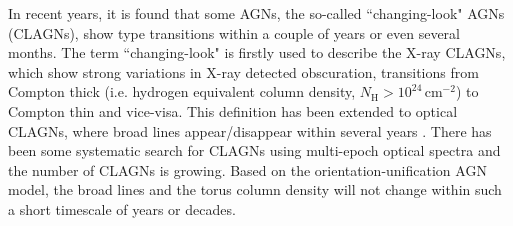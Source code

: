\documentclass[linenumbers]{aastex631}
\begin{document}
In recent years, it is found that some AGNs, the so-called ``changing-look" AGNs (CLAGNs), show type transitions within a couple of years or even several months. The term ``changing-look" is firstly used to describe the X-ray CLAGNs, which show strong variations in X-ray detected obscuration, transitions from Compton thick ({\color{red}i.e.} hydrogen equivalent column density, $N_\mathrm{H}> 10^{24}\,\mathrm{cm}^{-2}$) to Compton thin \citep[{\color{red}i.e.} $N_\mathrm{H} < 10^{22-23}\,\mathrm{cm}^{-2}$, e.g.,][]{2003MNRAS.342..422M} and vice-visa. This definition has been extended to optical CLAGNs, where broad lines appear/disappear within several years \citep[i.e. transit from type 1 to type 2 and vice-visa; e.g.,][]{2014ApJ...796..134D,2014ApJ...788...48S,2020ApJ...890L..29A,2020ApJ...901....1W}. There has been some systematic search for CLAGNs using multi-epoch optical spectra \citep[e.g.,][]{2018ApJ...862..109Y,2021MNRAS.503.2583S,2021A&A...650A..33P} and the number of CLAGNs is growing. Based on the orientation-unification AGN model, the broad lines and the torus column density will not change within such a short timescale of years or decades.

 

\end{document}
